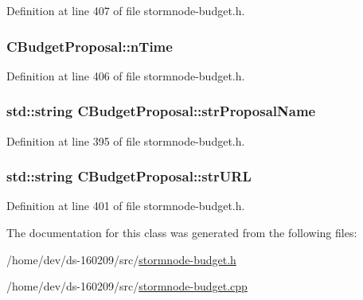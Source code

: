 Definition at line 407 of file stormnode-\/budget.\+h.

\hypertarget{class_c_budget_proposal_a73bbfda4189ae03fdecc3d6ddf984a42}{}
\subsubsection[{n\+Time}]{ C\+Budget\+Proposal\+::n\+Time}\label{class_c_budget_proposal_a73bbfda4189ae03fdecc3d6ddf984a42}


Definition at line 406 of file stormnode-\/budget.\+h.

\hypertarget{class_c_budget_proposal_ab881106333b75bf1a8c5c97d56cd6703}{}
\subsubsection[{str\+Proposal\+Name}]{\setlength{\rightskip}{0pt plus 5cm}std\+::string C\+Budget\+Proposal\+::str\+Proposal\+Name}\label{class_c_budget_proposal_ab881106333b75bf1a8c5c97d56cd6703}


Definition at line 395 of file stormnode-\/budget.\+h.

\hypertarget{class_c_budget_proposal_ac6ff1965ce0dca34221ec041ae831e83}{}
\subsubsection[{str\+U\+R\+L}]{\setlength{\rightskip}{0pt plus 5cm}std\+::string C\+Budget\+Proposal\+::str\+U\+R\+L}\label{class_c_budget_proposal_ac6ff1965ce0dca34221ec041ae831e83}


Definition at line 401 of file stormnode-\/budget.\+h.



The documentation for this class was generated from the following files\+:\begin{DoxyCompactItemize}
\item 
/home/dev/ds-\/160209/src/\hyperlink{stormnode-budget_8h}{stormnode-\/budget.\+h}\item 
/home/dev/ds-\/160209/src/\hyperlink{stormnode-budget_8cpp}{stormnode-\/budget.\+cpp}\end{DoxyCompactItemize}
